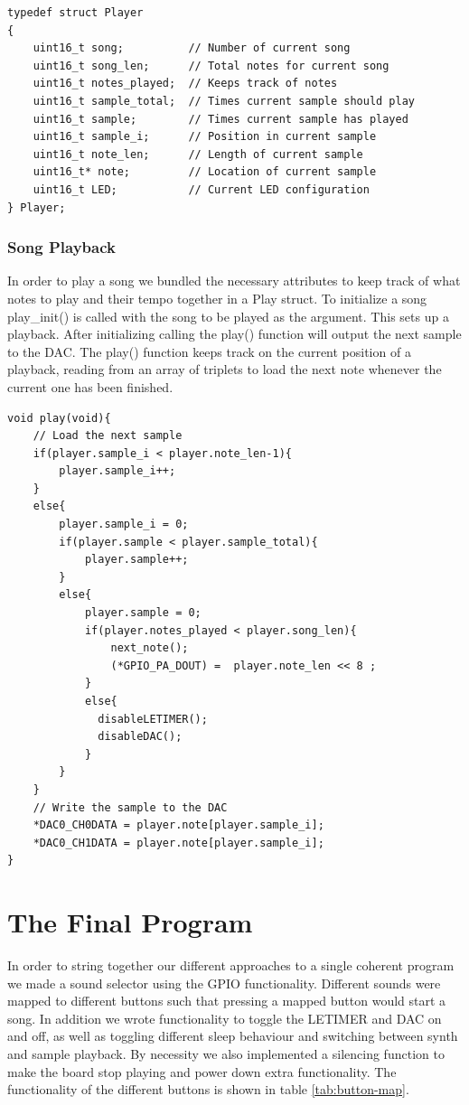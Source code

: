 \noindent\begin{minipage}{\textwidth}
\begin{lstlisting}
typedef struct Player
{
	uint16_t song;			// Number of current song
	uint16_t song_len;		// Total notes for current song
	uint16_t notes_played;	// Keeps track of notes
	uint16_t sample_total;	// Times current sample should play	
	uint16_t sample;		// Times current sample has played
	uint16_t sample_i;		// Position in current sample 
	uint16_t note_len;		// Length of current sample
	uint16_t* note;			// Location of current sample
	uint16_t LED;			// Current LED configuration
} Player;
\end{lstlisting}
\end{minipage}

\subsubsection{Song Playback}
In order to play a song we bundled the necessary attributes to keep track of what notes to play and their tempo together in a Play struct. To initialize a song play\_init() is called with the song to be played as the argument. This sets up a playback. After initializing calling the play() function will output the next sample to the DAC.
The play() function keeps track on the current position of a playback, reading from an array of triplets to load the next note whenever the current one has been finished.

\noindent\begin{minipage}{\textwidth}
\begin{lstlisting}
void play(void){
	// Load the next sample
	if(player.sample_i < player.note_len-1){			
		player.sample_i++;								
	}
	else{								
		player.sample_i = 0;
		if(player.sample < player.sample_total){
   			player.sample++;				
		}
		else{							
			player.sample = 0;
			if(player.notes_played < player.song_len){
				next_note();
				(*GPIO_PA_DOUT) =  player.note_len << 8 ;		
			}			 
			else{
			  disableLETIMER();
			  disableDAC();
			}
		}
	}
	// Write the sample to the DAC
	*DAC0_CH0DATA = player.note[player.sample_i];
	*DAC0_CH1DATA = player.note[player.sample_i];
}
\end{lstlisting}
\end{minipage}

\section{The Final Program}
In order to string together our different approaches to a single coherent program we made a sound selector using the GPIO functionality. Different sounds were mapped to different buttons such that pressing a mapped button would start a song. In addition we wrote functionality to toggle the LETIMER and DAC on and off, as well as toggling different sleep behaviour and switching between synth and sample playback. By necessity we also implemented a silencing function to make the board stop playing and power down extra functionality. The functionality of the different buttons is shown in table \ref{tab:button-map}.

